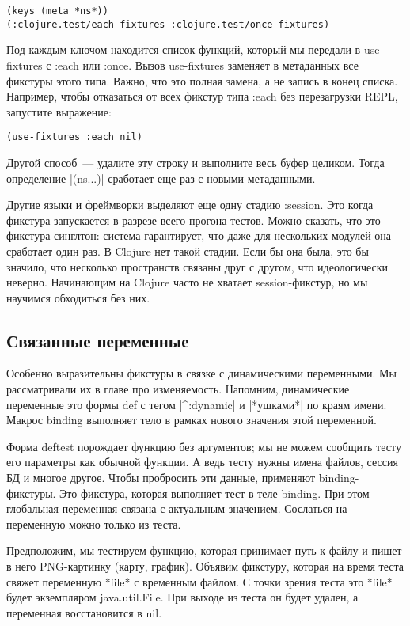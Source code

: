 \begin{verbatim}
(keys (meta *ns*))
(:clojure.test/each-fixtures :clojure.test/once-fixtures)
\end{verbatim}

Под каждым ключом находится список функций, который мы передали в use-fixtures с
:each или :once. Вызов use-fixtures заменяет в метаданных все фикстуры этого
типа. Важно, что это полная замена, а не запись в конец списка. Например, чтобы
отказаться от всех фикстур типа :each без перезагрузки REPL, запустите
выражение:

\begin{verbatim}
(use-fixtures :each nil)
\end{verbatim}

Другой способ~--- удалите эту строку и выполните весь буфер целиком. Тогда
определение \spverb|(ns...)| сработает еще раз с новыми метаданными.

Другие языки и фреймворки выделяют еще одну стадию :session. Это когда фикстура
запускается в разрезе всего прогона тестов. Можно сказать, что это
фикстура-синглтон: система гарантирует, что даже для нескольких модулей она
сработает один раз. В Clojure нет такой стадии. Если бы она была, это бы
значило, что несколько пространств связаны друг с другом, что идеологически
неверно. Начинающим на Clojure часто не хватает session-фикстур, но мы научимся
обходиться без них.

\subsection{Связанные переменные}

Особенно выразительны фикстуры в связке с динамическими переменными. Мы
рассматривали их в главе про изменяемость. Напомним, динамические переменные это
формы def с тегом \spverb|^:dynamic| и \spverb|*ушками*| по краям имени. Макрос
binding выполняет тело в рамках нового значения этой переменной.

Форма deftest порождает функцию без аргументов; мы не можем сообщить тесту его
параметры как обычной функции. А ведь тесту нужны имена файлов, сессия БД и
многое другое. Чтобы пробросить эти данные, применяют binding-фикстуры. Это
фикстура, которая выполняет тест в теле binding. При этом глобальная переменная
связана с актуальным значением. Сослаться на переменную можно только из теста.

Предположим, мы тестируем функцию, которая принимает путь к файлу и пишет в него
PNG-картинку (карту, график). Объявим фикстуру, которая на время теста свяжет
переменную *file* с временным файлом. С точки зрения теста это *file* будет
экземпляром java.util.File. При выходе из теста он будет удален, а переменная
восстановится в nil.

